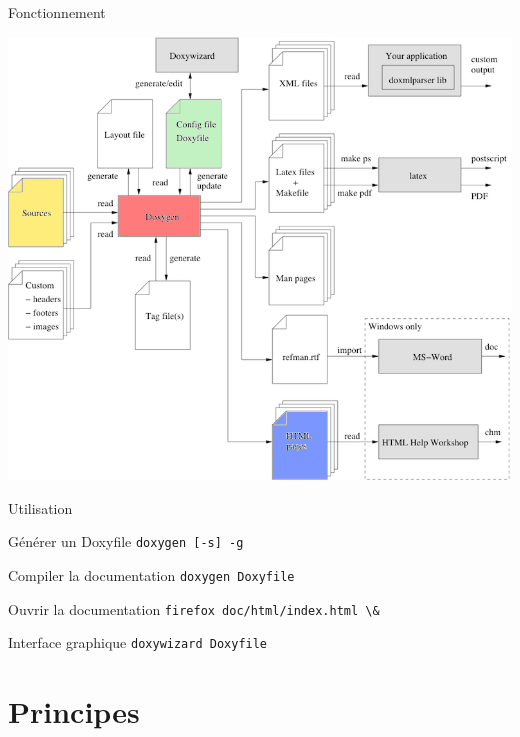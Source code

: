\documentclass{beamer}
\begin{document}
\begin{frame}{Fonctionnement}
\begin{center}
\includegraphics[height=0.9\textheight]{images/doxygen-flow2}
\end{center}
\end{frame}

\begin{frame}{Utilisation}
\begin{block}{Générer un Doxyfile}
\textcolor{commandcolor}{\verb?doxygen [-s] -g?}
\end{block}
\begin{block}{Compiler la documentation}
\textcolor{commandcolor}{\verb?doxygen Doxyfile?}
\end{block}
\begin{block}{Ouvrir la documentation}
\textcolor{commandcolor}{\verb?firefox doc/html/index.html \& ?}
\end{block}
\begin{block}{Interface graphique}
\textcolor{commandcolor}{\verb?doxywizard Doxyfile?}
\end{block}
\end{frame}



\section{Principes}
\end{document}
